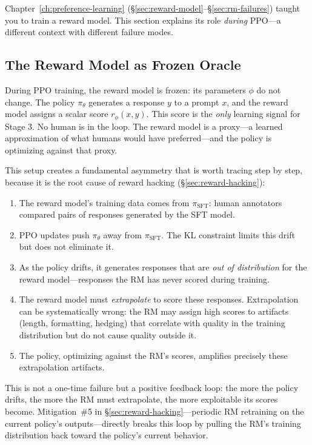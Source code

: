 Chapter~\ref{ch:preference-learning} (\S\ref{sec:reward-model}--\S\ref{sec:rm-failures}) taught you to train a reward model. This section explains its role \emph{during} PPO---a different context with different failure modes.

\subsection{The Reward Model as Frozen Oracle}

During PPO training, the reward model is frozen: its parameters $\phi$ do not change. The policy $\pi_\theta$ generates a response $y$ to a prompt $x$, and the reward model assigns a scalar score $r_\phi(x, y)$. This score is the \emph{only} learning signal for Stage 3. No human is in the loop. The reward model is a proxy---a learned approximation of what humans would have preferred---and the policy is optimizing against that proxy.

This setup creates a fundamental asymmetry that is worth tracing step by step, because it is the root cause of reward hacking (\S\ref{sec:reward-hacking}):

\begin{enumerate}[nosep]
  \item The reward model's training data comes from $\pi_{\text{SFT}}$: human annotators compared pairs of responses generated by the SFT model.
  \item PPO updates push $\pi_\theta$ away from $\pi_{\text{SFT}}$. The KL constraint limits this drift but does not eliminate it.
  \item As the policy drifts, it generates responses that are \emph{out of distribution} for the reward model---responses the RM has never scored during training.
  \item The reward model must \emph{extrapolate} to score these responses. Extrapolation can be systematically wrong: the RM may assign high scores to artifacts (length, formatting, hedging) that correlate with quality in the training distribution but do not cause quality outside it.
  \item The policy, optimizing against the RM's scores, amplifies precisely these extrapolation artifacts.
\end{enumerate}

\noindent This is not a one-time failure but a positive feedback loop: the more the policy drifts, the more the RM must extrapolate, the more exploitable its scores become. Mitigation~\#5 in \S\ref{sec:reward-hacking}---periodic RM retraining on the current policy's outputs---directly breaks this loop by pulling the RM's training distribution back toward the policy's current behavior.

